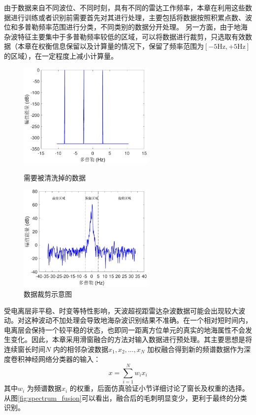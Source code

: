 由于数据来自不同波位、不同时刻，具有不同的雷达工作频率，本章在利用这些数据进行训练或者识别前需要首先对其进行处理，主要包括将数据按照积累点数、波位和多普勒频率范围进行分类，不同类别的数据分开处理。
另一方面，由于地海杂波特征主要集中于多普勒频率较低的区域，可以将数据进行裁剪，只选取有效数据（本章在权衡信息保留以及计算量的情况下，保留了频率范围为$[-5\text{Hz},+5\text{Hz}]$的区域），在一定程度上减小计算量。
\begin{figure}[hbt]
	\centering
	\begin{minipage}{7cm}
		\includegraphics[width=6.67cm]{figures/othr/delete}
		\caption{需要被清洗掉的数据}
		\label{fig:delete}

	\end{minipage}
	\hspace{10pt}
	\begin{minipage}{7cm}
		\includegraphics[width=6.67cm]{figures/othr/cut}
		\caption{数据裁剪示意图}
		\label{fig:cut}

	\end{minipage}

\end{figure}

受电离层非平稳、时变等特性影响，天波超视距雷达杂波数据可能会出现较大波动。对这种波动不加处理会导致地海杂波识别结果不准确。在一个相对短时间内，电离层会保持一个较平稳的状态，也即同一距离方位单元的真实的地海属性不会发生变化。因此，本章采用滑窗融合的方法对输入数据进行预处理。其主要思想是将连续窗长时间$N$ 内的相邻杂波数据$x_1,x_2,\dots,x_N$ 加权融合得到新的频谱数据作为深度卷积神经网络分类器的输入：
\begin{equation}
	x=\sum_{i=1}^N w_ix_i
	\label{equ:window_fusion}
\end{equation}
其中$w_i$ 为频谱数据$x_i$ 的权重，后面仿真验证小节详细讨论了窗长及权重的选择。从图\ref{fig:spectrum_fusion}可以看出，融合后的毛刺明显变少，更利于最终的分类识别。

